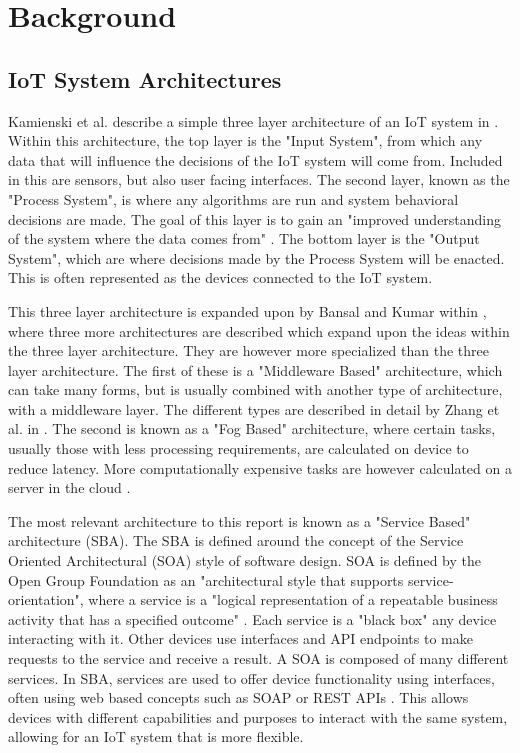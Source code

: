 \chapter{Background} \label{cha:chapter2}

\section{IoT System Architectures} \label{sec:chap2:architectures}
Kamienski et al. describe a simple three layer architecture of an IoT system in \cite{DesigningOpenIotSystem}. Within this architecture, the top layer is the "Input System", from which any data that will influence the decisions of the IoT system will come from. Included in this are sensors, but also user facing interfaces. The second layer, known as the "Process System", is where any algorithms are run and system behavioral decisions are made. The goal of this layer is to gain an "improved understanding of the system where the  data comes from" \cite{DesigningOpenIotSystem}. The bottom layer is the "Output System", which are where decisions made by the Process System will be enacted. This is often represented as the devices connected to the IoT system.

This three layer architecture is expanded upon by Bansal and Kumar within \cite{IotEcosystemSurvey}, where three more architectures are described which expand upon the ideas within the three layer architecture. They are however more specialized than the three layer architecture. The first of these is a "Middleware Based" architecture, which can take many forms, but is usually combined with another type of architecture, with a middleware layer. The different types are described in detail by Zhang et al. in \cite{MiddlewareIOTSurvey}. The second is known as a "Fog Based" architecture, where certain tasks, usually those with less processing requirements, are calculated on device to reduce latency. More computationally expensive tasks are however calculated on a server in the cloud \cite{IoTArchitectures}.

The most relevant architecture to this report is known as a "Service Based" architecture (SBA). The SBA is defined around the concept of the Service Oriented Architectural (SOA) style \cite{InteractingSoaBasedIot} of software design. SOA is defined by the Open Group Foundation as an "architectural style that supports service-orientation", where a service is a "logical representation of a repeatable business activity that has a specified outcome" \cite{SoaSourceBook}. Each service is a "black box" any device interacting with it. Other devices use interfaces and API endpoints to make requests to the service and receive a result. A SOA is composed of many different services. In SBA, services are used to offer device functionality using interfaces, often using web based concepts such as SOAP or REST APIs \cite{TrustManagementSoaIot}. This allows devices with different capabilities and purposes to interact with the same system, allowing for an IoT system that is more flexible. 


